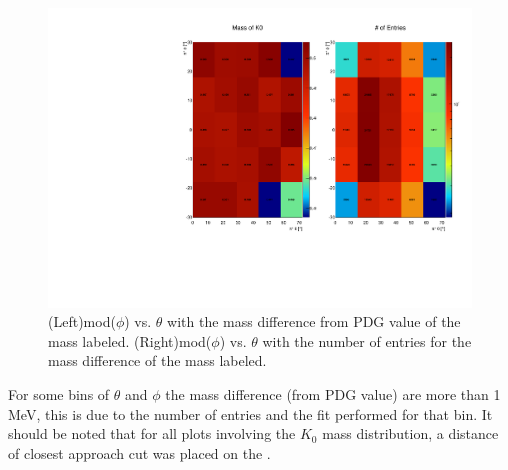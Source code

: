 	\begin{figure}[h]
		\centering
		\includegraphics[page=4,width=.45\textwidth,rotate=-90]{MK_Response/PLOTS_FOR_56669/K0_OnePhi_C2.pdf} 
		\caption{(Left)\pim mod($\phi$) vs. $\theta$ with the mass difference from PDG value of the \Ks mass labeled. (Right)\pim mod($\phi$) vs. $\theta$ with the number of entries for the mass difference of the \Ks mass labeled.}
		\label{fig:TestIV}
	\end{figure}
 	 For some bins of $\theta$ and $\phi$ the \Ks mass difference (from PDG value) are more than 1 MeV, this is due to the number of entries and the fit performed for that bin. It should be noted that for all plots involving the $K_0$ mass distribution, a distance of closest approach cut was placed on the \pippim. 
 	 	 
\FloatBarrier
